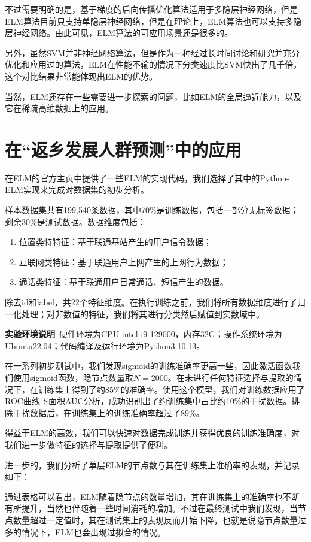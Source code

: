 \documentclass[conference]{IEEEtran}
\begin{document}
不过需要明确的是，基于梯度的后向传播优化算法适用于多隐层神经网络，但是ELM算法目前只支持单隐层神经网络，但是在理论上，ELM算法也可以支持多隐层神经网络。由此可见，ELM算法的可应用场景还是很多的。

另外，虽然SVM并非神经网络算法，但是作为一种经过长时间讨论和研究并充分优化和应用过的算法，ELM在性能不输的情况下分类速度比SVM快出了几千倍，这个对比结果非常能体现出ELM的优势。

当然，ELM还存在一些需要进一步探索的问题，比如ELM的全局逼近能力，以及它在稀疏高维数据上的应用。

\section{在“返乡发展人群预测”中的应用}

在ELM的官方主页\cite{ol:elmorg}中提供了一些ELM的实现代码，我们选择了其中的Python-ELM实现来完成对数据集的初步分析。

样本数据集共有199,540条数据，其中70\%是训练数据，包括一部分无标签数据；剩余30\%是测试数据。数据维度包括：
\begin{enumerate}
	\item 位置类特特征：基于联通基站产生的用户信令数据；
	\item 互联网类特征：基于联通用户上网产生的上网行为数据；
	\item 通话类特征：基于联通用户日常通话、短信产生的数据。
\end{enumerate}
除去id和label，共22个特征维度。在执行训练之前，我们将所有数据维度进行了归一化处理；对非数值的特征，我们将其进行分类然后赋值到实数域中。

\textbf{实验环境说明}\ 硬件环境为CPU intel i9-129000，内存32G；操作系统环境为Ubuntu22.04；代码编译及运行环境为Python3.10.13。

在一系列初步测试中，我们发现sigmoid的训练准确率更高一些，因此激活函数我们使用sigmoid函数，隐节点数量取$N=2000$。在未进行任何特征选择与提取的情况下，在训练集上得到了约85\%的准确率。使用这个模型，我们对训练数据应用了ROC曲线下面积AUC分析，成功识别出了约训练集中占比约10\%的干扰数据。排除干扰数据后，在训练集上的训练准确率超过了89\%。

得益于ELM的高效，我们可以快速对数据完成训练并获得优良的训练准确度，对我们进一步做特征的选择与提取提供了便利。

进一步的，我们分析了单层ELM的节点数与其在训练集上准确率的表现，并记录如下：

通过表格可以看出，ELM随着隐节点的数量增加，其在训练集上的准确率也不断有所提升，当然也伴随着一些时间消耗的增加。不过在最终测试中我们发现，当节点数量超过一定值时，其在测试集上的表现反而开始下降，也就是说隐节点数量过多的情况下，ELM也会出现过拟合的情况。
\end{document}
